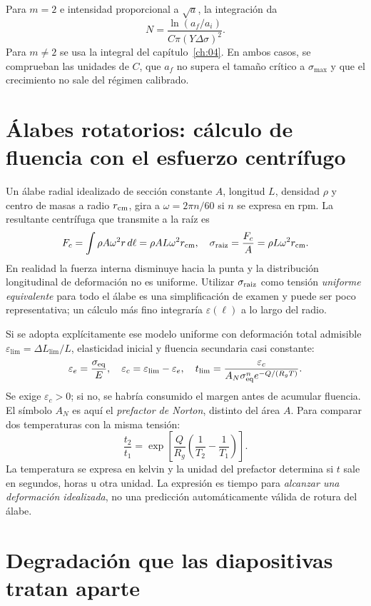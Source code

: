 Para $m=2$ e intensidad proporcional a $\sqrt a$, la integración da
\[
N=\frac{\ln(a_f/a_i)}{C\pi(Y\Delta\sigma)^2}.
\]
Para $m\ne2$ se usa la integral del capítulo~\ref{ch:04}. En ambos casos, se comprueban las unidades de $C$, que $a_f$ no supera el tamaño crítico a $\sigma_{\max}$ y que el crecimiento no sale del régimen calibrado.

\section{Álabes rotatorios: cálculo de fluencia con el esfuerzo centrífugo}
Un álabe radial idealizado de sección constante $A$, longitud $L$, densidad $\rho$ y centro de masas a radio $r_{\rm cm}$, gira a $\omega=2\pi n/60$ si $n$ se expresa en rpm. La resultante centrífuga que transmite a la raíz es
\[
F_c=\int\rho A\omega^2r\,d\ell
=\rho AL\omega^2r_{\rm cm},\quad
\sigma_{\rm raiz}=\frac{F_c}{A}=\rho L\omega^2r_{\rm cm}.
\]
En realidad la fuerza interna disminuye hacia la punta y la distribución longitudinal de deformación no es uniforme. Utilizar $\sigma_{\rm raiz}$ como tensión \emph{uniforme equivalente} para todo el álabe es una simplificación de examen y puede ser poco representativa; un cálculo más fino integraría $\varepsilon(\ell)$ a lo largo del radio.

Si se adopta explícitamente ese modelo uniforme con deformación total admisible $\varepsilon_{\lim}=\Delta L_{\lim}/L$, elasticidad inicial y fluencia secundaria casi constante:
\begin{equation}
\varepsilon_e=\frac{\sigma_{\rm eq}}E,\quad
\varepsilon_c=\varepsilon_{\lim}-\varepsilon_e,\quad
t_{\lim}=\frac{\varepsilon_c}{A_N\sigma_{\rm eq}^n e^{-Q/(R_gT)}}.
\label{eq:puente-alabe}
\end{equation}
Se exige $\varepsilon_c>0$; si no, se habría consumido el margen antes de acumular fluencia. El símbolo $A_N$ es aquí el \emph{prefactor de Norton}, distinto del área $A$. Para comparar dos temperaturas con la misma tensión:
\[
\frac{t_2}{t_1}=
\exp\left[\frac Q{R_g}\left(\frac1{T_2}-\frac1{T_1}\right)\right].
\]
La temperatura se expresa en kelvin y la unidad del prefactor determina si $t$ sale en segundos, horas u otra unidad. La expresión es tiempo para \emph{alcanzar una deformación idealizada}, no una predicción automáticamente válida de rotura del álabe.

\section{Degradación que las diapositivas tratan aparte}
